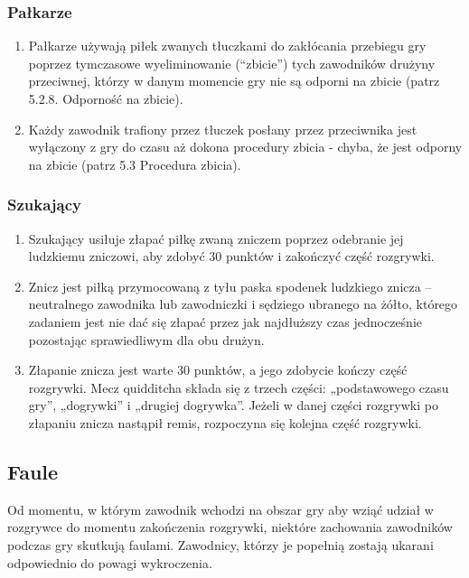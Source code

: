 \documentclass[12pt]{article}
\begin{document}
\subsubsection{Pałkarze}
\begin{enumerate}
\item Pałkarze używają piłek zwanych tłuczkami do zakłócania przebiegu gry
poprzez tymczasowe wyeliminowanie (``zbicie'') tych zawodników drużyny
przeciwnej, którzy w danym momencie gry nie są odporni na zbicie (patrz
5.2.8. Odporność na zbicie).

\item Każdy zawodnik trafiony przez tłuczek posłany przez przeciwnika jest
wyłączony z gry do czasu aż dokona procedury zbicia - chyba, że jest
odporny na zbicie (patrz 5.3 Procedura zbicia).
\end{enumerate}

\subsubsection{Szukający}
\begin{enumerate}
\item Szukający usiłuje złapać piłkę zwaną zniczem poprzez odebranie jej
ludzkiemu zniczowi, aby zdobyć 30 punktów i zakończyć część rozgrywki.

\item Znicz jest piłką przymocowaną z tyłu paska spodenek ludzkiego znicza
-- neutralnego zawodnika lub zawodniczki i sędziego ubranego na żółto,
którego zadaniem jest nie dać się złapać przez jak najdłuższy czas
jednocześnie pozostając sprawiedliwym dla obu drużyn.

\item Złapanie znicza jest warte 30 punktów, a jego zdobycie kończy część
rozgrywki. Mecz quidditcha składa się z trzech części: „podstawowego
czasu gry'', „dogrywki'' i „drugiej dogrywka''. Jeżeli w danej części
rozgrywki po złapaniu znicza nastąpił remis, rozpoczyna się kolejna
część rozgrywki.
\end{enumerate}

\subsection{Faule}
Od momentu, w którym zawodnik wchodzi na obszar gry aby wziąć udział w
rozgrywce do momentu zakończenia rozgrywki, niektóre zachowania
zawodników podczas gry skutkują faulami. Zawodnicy, którzy je popełnią
zostają ukarani odpowiednio do powagi wykroczenia.
\end{document}
